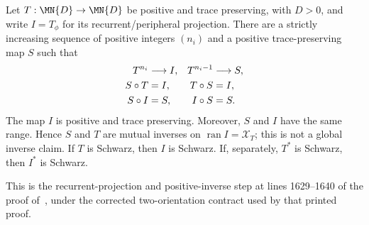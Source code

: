 \begin{theorem}
    \label{thm:wolf_cycle_recurrent_peripheral_inverse}
    \leanok
    Let $T:\MN{D}\to\MN{D}$ be positive and trace preserving, with $D>0$,
    and write $I=T_\phi$ for its recurrent/peripheral projection. There are
    a strictly increasing sequence of positive integers $(n_i)$ and a
    positive trace-preserving map $S$ such that
    \begin{align}
        T^{n_i}&\longrightarrow I, &
        T^{n_i-1}&\longrightarrow S, \notag \\
        S\circ T&=I, & T\circ S&=I, \notag \\
        S\circ I&=S, & I\circ S&=S. \notag
    \end{align}
    The map $I$ is positive and trace preserving. Moreover, $S$ and $I$ have
    the same range. Hence $S$ and $T$ are mutual inverses on
    $\operatorname{ran}I=\mathcal{X}_T$; this is not a global inverse claim.
    If $T$ is Schwarz, then $I$ is Schwarz. If, separately, $T^*$ is Schwarz,
    then $I^*$ is Schwarz.

    This is the recurrent-projection and positive-inverse step at lines
    1629--1640 of the proof of~\cite[Theorem~6.16]{Wolf2012Quantum}, under the
    corrected two-orientation contract used by that printed proof.
\end{theorem}

